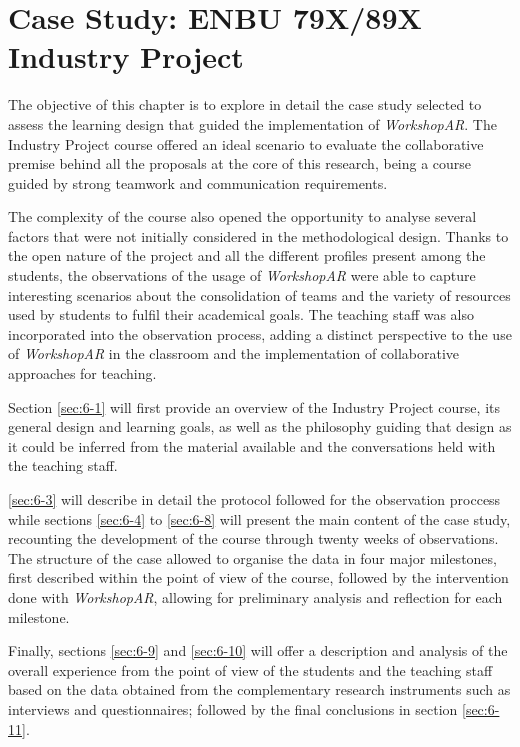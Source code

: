 \chapter{Case Study: ENBU 79X/89X Industry Project \label{ch6}}

The objective of this chapter is to explore in detail the case study selected to assess the learning design that guided the implementation of \emph{WorkshopAR}. The
Industry Project course offered an ideal scenario to evaluate the collaborative premise behind all the proposals at the core of this research, being a course guided by
strong teamwork and communication requirements.

The complexity of the course also opened the opportunity to analyse several factors that were not initially considered in the methodological design. Thanks to the open
nature of the project and all the different profiles present among the students, the observations of the usage of \emph{WorkshopAR} were able to capture interesting
scenarios about the consolidation of teams and the variety of resources used by students to fulfil their academical goals. The teaching staff was also incorporated into
the observation process, adding a distinct perspective to the use of \emph{WorkshopAR} in the classroom and the implementation of collaborative approaches for teaching.

Section \ref{sec:6-1} will first provide an overview of the Industry Project course, its general design and learning goals, as well as the philosophy guiding that design
as it could be inferred from the material available and the conversations held with the teaching staff.

\ref{sec:6-3} will describe in detail the protocol followed for the observation proccess while sections \ref{sec:6-4} to \ref{sec:6-8} will present the main content of the
case study, recounting the development of the course through twenty weeks of observations. The structure of the case allowed to organise the data in four major milestones,
first described within the point of view of the course, followed by the intervention done with \emph{WorkshopAR}, allowing for preliminary analysis and reflection for each
milestone.

Finally, sections \ref{sec:6-9} and \ref{sec:6-10} will offer a description and analysis of the overall experience from the point of view of the students and the teaching
staff based on the data obtained from the complementary research instruments such as interviews and questionnaires; followed by the final conclusions in section \ref{sec:6-11}.

